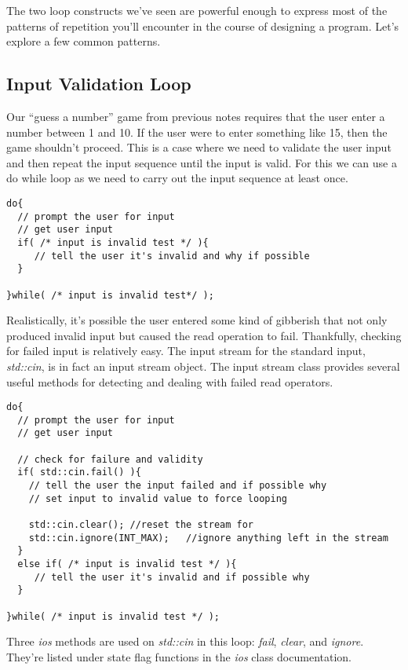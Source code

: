 \documentclass[]{tufte-handout}
\begin{document}
The two loop constructs we've seen are powerful enough to express most of the patterns of repetition you'll encounter in the course of designing a program. Let's explore a few common patterns.

\subsection{Input Validation Loop}

Our ``guess a number'' game from previous notes requires that the user enter a number between 1 and 10.  If the user were to enter something like 15, then the game shouldn't proceed.  This is a case where we need to validate the user input and then repeat the input sequence until the input is valid.  For this we can use a do while loop as we need to carry out the input sequence at least once. 

\begin{verbatim}
do{
  // prompt the user for input
  // get user input
  if( /* input is invalid test */ ){
     // tell the user it's invalid and why if possible
  }
 
}while( /* input is invalid test*/ );
\end{verbatim} 

Realistically, it's possible the user entered some kind of gibberish that not only produced invalid input but caused the read operation to fail. Thankfully, checking for failed input is relatively easy.  The input stream for the standard input, \textit{std::cin}, is in fact an input stream object. The input stream class provides several useful  methods for detecting and dealing with failed read operators. 

\begin{verbatim}
do{
  // prompt the user for input
  // get user input

  // check for failure and validity
  if( std::cin.fail() ){
  	// tell the user the input failed and if possible why
  	// set input to invalid value to force looping
  	
	std::cin.clear(); //reset the stream for 
    std::cin.ignore(INT_MAX);	//ignore anything left in the stream 
  }
  else if( /* input is invalid test */ ){
     // tell the user it's invalid and if possible why
  }
 
}while( /* input is invalid test */ );
\end{verbatim} 
Three \textit{ios} methods are used on \textit{std::cin} in this loop: \textit{fail}, \textit{clear}, and \textit{ignore}.  They're listed under state flag functions in the \textit{ios} class documentation.
\end{document}
